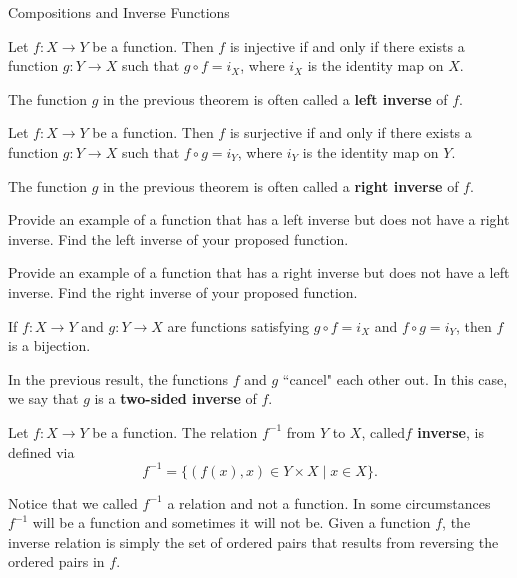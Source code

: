 \begin{section}{Compositions and Inverse Functions}
\begin{theorem}
Let $f:X\to Y$ be a function. Then $f$ is injective if and only if there exists a function $g:Y\to X$ such that $g\circ f=i_X$, where $i_X$ is the identity map on $X$.
\end{theorem}

The function $g$ in the previous theorem is often called a \textbf{left inverse} of $f$.

\begin{theorem}
Let $f:X\to Y$ be a function. Then $f$ is surjective if and only if there exists a function $g:Y\to X$ such that $f\circ g=i_Y$, where $i_Y$ is the identity map on $Y$.
\end{theorem}

The function $g$ in the previous theorem is often called a \textbf{right inverse} of $f$.

\begin{problem}
Provide an example of a function that has a left inverse but does not have a right inverse. Find the left inverse of your proposed function.
\end{problem}

\begin{problem}
Provide an example of a function that has a right inverse but does not have a left inverse. Find the right inverse of your proposed function.
\end{problem}

\begin{corollary}\label{cor:two-sided inverse}
If $f:X\to Y$ and $g:Y\to X$ are functions satisfying $g\circ f=i_X$ and  $f\circ g=i_Y$, then $f$ is a bijection.
\end{corollary}

In the previous result, the functions $f$ and $g$ ``cancel" each other out. In this case, we say that $g$ is a \textbf{two-sided inverse} of $f$.

\begin{definition}
Let $f:X\to Y$ be a function.  The relation $f^{-1}$ from $Y$ to $X$, called\textbf{$f$ inverse}, is defined via
\[
f^{-1}=\{(f(x),x)\in Y\times X\mid x\in X\}.
\] 
\end{definition}

Notice that we called $f^{-1}$ a relation and not a function.  In some circumstances $f^{-1}$ will be a function and sometimes it will not be. Given a function $f$, the inverse relation is simply the set of ordered pairs that results from reversing the ordered pairs in $f$.


\end{section}
